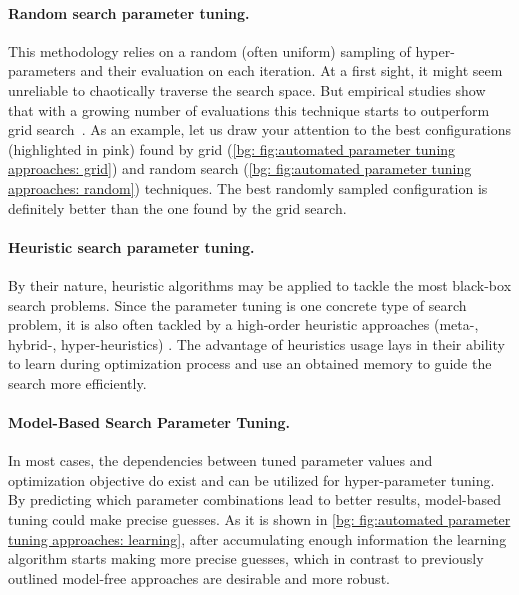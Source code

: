 \paragraph{Random search parameter tuning.} This methodology relies on a random (often uniform) sampling of hyper-parameters and their evaluation on each iteration. At a first sight, it might seem unreliable to chaotically traverse the search space. But empirical studies show that with a growing number of evaluations this technique starts to outperform grid search~\cite{bergstra2012random}. As an example, let us draw your attention to the best configurations (highlighted in pink) found by grid (\cref{bg: fig:automated parameter tuning approaches: grid}) and random search (\cref{bg: fig:automated parameter tuning approaches: random}) techniques. The best randomly sampled configuration is definitely better than the one found by the grid search.

\paragraph{Heuristic search parameter tuning.} By their nature, heuristic algorithms may be applied to tackle the most black-box search problems. Since the parameter tuning is one concrete type of search problem, it is also often tackled by a high-order heuristic approaches (meta-, hybrid-, hyper-heuristics) \cite{crawford2013parameter1,crawford2013parameter2,carrizosa2014nested}. The advantage of heuristics usage lays in their ability to learn during optimization process and use an obtained memory to guide the search more efficiently.

\paragraph{Model-Based Search Parameter Tuning.} In most cases, the dependencies between tuned parameter values and optimization objective do exist and can be utilized for hyper-parameter tuning. By predicting which parameter combinations lead to better results, model-based tuning could make precise guesses. As it is shown in \cref{bg: fig:automated parameter tuning approaches: learning}, after accumulating enough information the learning algorithm starts making more precise guesses, which in contrast to previously outlined model-free approaches are desirable and more robust.

